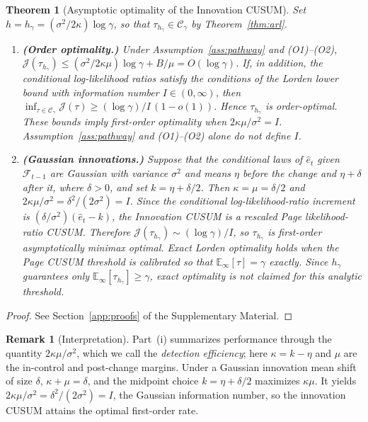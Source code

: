 \documentclass[bj,authoryear]{imsart}
\theoremstyle{plain}
\newtheorem{theorem}{Theorem}[section]
\theoremstyle{definition}
\newtheorem{remark}{Remark}[section]
\newcommand{\E}{\mathbb{E}}
\newcommand{\F}{\mathcal{F}}
\begin{document}
\begin{theorem}[Asymptotic optimality of the Innovation CUSUM]
\label{thm:optimality}
Set $h=h_\gamma=(\sigma^2/2\kappa)\log\gamma$, so that
$\tau_{h_\gamma}\in\mathcal C_\gamma$ by Theorem~\ref{thm:arl}.
\begin{enumerate}[label=(\roman*), itemsep=3pt]
\item \textbf{(Order optimality.)}  Under Assumption~\ref{ass:pathway}
and (O1)--(O2),
$\mathcal J(\tau_{h_\gamma})\leq(\sigma^2/2\kappa\mu)\log\gamma+B/\mu
=O(\log\gamma)$.
If, in addition, the conditional log-likelihood ratios satisfy the
conditions of the Lorden lower bound \citep{lorden1971procedures} with information number
$I\in(0,\infty)$, then
$\inf_{\tau\in\mathcal C_\gamma}\mathcal J(\tau)
\geq(\log\gamma)/I\,(1-o(1))$.
Hence $\tau_{h_\gamma}$ is order-optimal.  These bounds imply
first-order optimality when $2\kappa\mu/\sigma^2=I$.
Assumption~\ref{ass:pathway} and (O1)--(O2) alone do not define $I$.


\item \textbf{(Gaussian innovations.)}
  Suppose that the conditional laws of $\hat e_t$ given $\F_{t-1}$ are
  Gaussian with variance $\sigma^2$ and means $\eta$ before the change
  and $\eta+\delta$ after it, where $\delta>0$, and set
  $k=\eta+\delta/2$.  Then $\kappa=\mu=\delta/2$ and
  $2\kappa\mu/\sigma^2=\delta^2/(2\sigma^2)=I$.
  Since the conditional log-likelihood-ratio increment is
  $(\delta/\sigma^2)(\hat e_t-k)$, the Innovation CUSUM is a rescaled
  Page likelihood-ratio CUSUM.  Therefore
  $\mathcal J(\tau_{h_\gamma})\sim(\log\gamma)/I$, so
  $\tau_{h_\gamma}$ is first-order asymptotically minimax optimal.
  Exact Lorden optimality \citep{moustakides1986optimal} holds when the
  Page CUSUM threshold is calibrated so that
  $\E_\infty[\tau]=\gamma$ exactly.  Since $h_\gamma$ guarantees only
  $\E_\infty[\tau_{h_\gamma}]\geq\gamma$, exact optimality is not claimed
  for this analytic threshold.


\end{enumerate}
\end{theorem}


\begin{proof}
  See Section~\ref{app:proofs} of the Supplementary Material.
\end{proof}

\begin{remark}[Interpretation]
Part~(i) summarizes performance through the quantity
$2\kappa\mu/\sigma^2$, which we call the \emph{detection efficiency}; here
$\kappa=k-\eta$ and $\mu$ are the in-control and post-change margins.  Under a Gaussian innovation mean shift of size
$\delta$, $\kappa+\mu=\delta$, and the midpoint choice
$k=\eta+\delta/2$ maximizes $\kappa\mu$.  It yields
$2\kappa\mu/\sigma^2=\delta^2/(2\sigma^2)=I$, the Gaussian information
number, so the innovation CUSUM attains the optimal first-order rate.
\end{remark}
\end{document}
